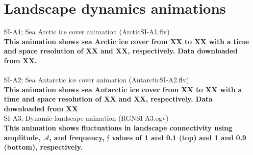 \documentclass[12pt]{article}
\begin{document}
\section*{Landscape dynamics animations}
SI-A1; Sea Arctic ice cover animation (ArcticSI-A1.flv)\\
{\bf This animation shows sea Arctic ice cover from XX to XX with a time and space resolution of XX and XX, respectively. Data downloaded from XX.}
\\
\\
SI-A2; Sea Antarctic ice cover animation (AntarcticSI-A2.flv)\\
{\bf This animation shows sea Antarctic ice cover from XX to XX with a time and space resolution of XX and XX, respectively. Data downloaded from XX}
\\
SI-A3; Dynamic landscape animation (RGNSI-A3.ogv)\\
{\bf This animation shows fluctuations in landscape connectivity using amplitude, $\mathcal{A}$, and frequency, $\mathfrak{f}$ values of 1 and 0.1 (top) and 1 and 0.9 (bottom), respectively.}
\end{document}

